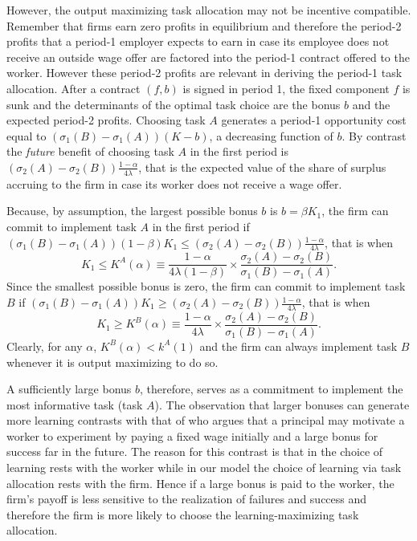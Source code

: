 \documentclass[12pt,american]{paper}
\theoremstyle{remark}
\begin{document}
However, the output maximizing task allocation may not be incentive compatible. Remember that firms earn zero profits in equilibrium and therefore the period-2 profits that a period-1 employer expects to earn in case its employee does not receive an outside wage offer are factored into the period-1 contract offered to the  worker. However these period-2 profits  are relevant in deriving the period-1 task allocation. After a contract $(f,b)$  is signed in period 1, the fixed component $f$ is sunk and the determinants of the optimal task choice are the bonus $b$ and the expected period-2 profits. Choosing task $A$ generates a period-1 opportunity cost equal to $( \sigma_1(B)- \sigma_1(A))(K-b)$, a decreasing function of $b$. By contrast the \textit{future} benefit of choosing task $A$ in the first period is $(\sigma_2(A)-\sigma_2(B))\frac{1-\alpha}{4\lambda}$, that is the expected value of the share of surplus accruing to the firm in case its worker does not receive a wage offer.


Because, by assumption, the largest possible bonus $b$ is $b=\beta K_1$,  the firm can commit to implement task $A$ in the first period if $( \sigma_1(B)- \sigma_1(A))(1-\beta)K_1\leq(\sigma_2(A)-\sigma_2(B))\frac{1-\alpha}{4\lambda} $, that is when 
%
\begin{equation}\label{KA}
K_1\leq K^A(\alpha)\equiv   \frac{1-\alpha}{4 \lambda (1-\beta) }\times \frac{ \sigma_2(A)- \sigma_2(B)}{ \sigma_1(B)- \sigma_1(A)}.
\end{equation}
Since the smallest possible bonus is zero, the firm can commit to implement task $B$ if $(\sigma_1(B)-\sigma_1(A))K_1 \geq (\sigma_2(A)-\sigma_2(B))\frac{1-\alpha}{4\lambda}$, that is when
\begin{equation*}%
K_1\geq K^B(\alpha)\equiv \frac{1-\alpha}{4 \lambda } \times \frac{ \sigma_2(A)- \sigma_2(B)}{ \sigma_1(B)- \sigma_1(A)} .
\end{equation*}
%
Clearly, for any $\alpha$, $K^B(\alpha)<k^A(1)$ and the firm can always implement task $B$ whenever it is output maximizing to do so.


A sufficiently large bonus $b$, therefore, serves as a commitment to implement the most informative task (task $A$). The observation that larger bonuses can generate more learning contrasts with that of \citet{manso2011motivating} who argues that a principal may motivate a worker to experiment by paying a fixed wage initially and a large bonus for success far in the future. The reason for this contrast is that  in \citet{manso2011motivating} the choice of learning rests with the worker while in our model the choice of learning via task allocation rests with the firm. Hence if a large bonus is paid to the worker, the firm's payoff is less sensitive to the realization of failures and success and therefore the firm is more likely to choose the learning-maximizing task allocation.
\end{document}
